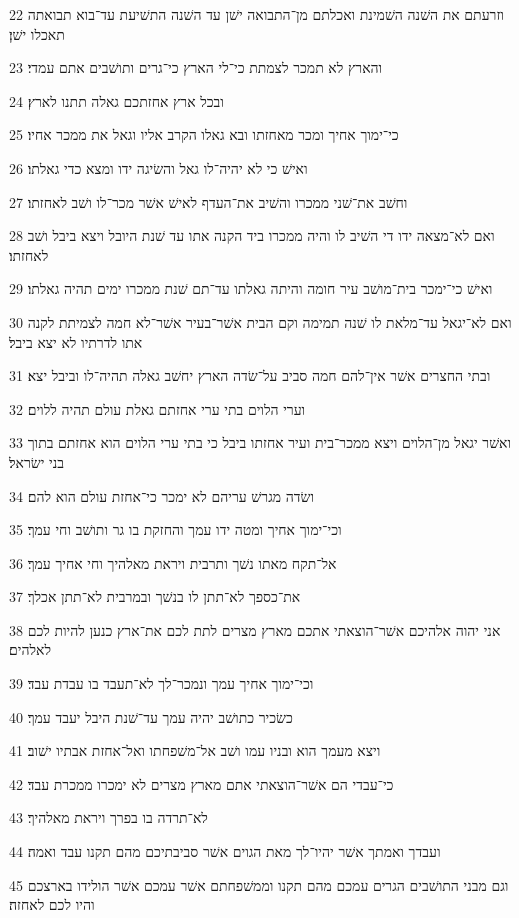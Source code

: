 \par 22 וזרעתם את השׁנה השׁמינת ואכלתם מן־התבואה ישׁן עד השׁנה התשׁיעת עד־בוא תבואתה תאכלו ישׁן׃
\par 23 והארץ לא תמכר לצמתת כי־לי הארץ כי־גרים ותושׁבים אתם עמדי׃
\par 24 ובכל ארץ אחזתכם גאלה תתנו לארץ׃
\par 25 כי־ימוך אחיך ומכר מאחזתו ובא גאלו הקרב אליו וגאל את ממכר אחיו׃
\par 26 ואישׁ כי לא יהיה־לו גאל והשׂיגה ידו ומצא כדי גאלתו׃
\par 27 וחשׁב את־שׁני ממכרו והשׁיב את־העדף לאישׁ אשׁר מכר־לו ושׁב לאחזתו׃
\par 28 ואם לא־מצאה ידו די השׁיב לו והיה ממכרו ביד הקנה אתו עד שׁנת היובל ויצא ביבל ושׁב לאחזתו׃
\par 29 ואישׁ כי־ימכר בית־מושׁב עיר חומה והיתה גאלתו עד־תם שׁנת ממכרו ימים תהיה גאלתו׃
\par 30 ואם לא־יגאל עד־מלאת לו שׁנה תמימה וקם הבית אשׁר־בעיר אשׁר־לא חמה לצמיתת לקנה אתו לדרתיו לא יצא ביבל׃
\par 31 ובתי החצרים אשׁר אין־להם חמה סביב על־שׂדה הארץ יחשׁב גאלה תהיה־לו וביבל יצא׃
\par 32 וערי הלוים בתי ערי אחזתם גאלת עולם תהיה ללוים׃
\par 33 ואשׁר יגאל מן־הלוים ויצא ממכר־בית ועיר אחזתו ביבל כי בתי ערי הלוים הוא אחזתם בתוך בני ישׂראל׃
\par 34 ושׂדה מגרשׁ עריהם לא ימכר כי־אחזת עולם הוא להם׃
\par 35 וכי־ימוך אחיך ומטה ידו עמך והחזקת בו גר ותושׁב וחי עמך׃
\par 36 אל־תקח מאתו נשׁך ותרבית ויראת מאלהיך וחי אחיך עמך׃
\par 37 את־כספך לא־תתן לו בנשׁך ובמרבית לא־תתן אכלך׃
\par 38 אני יהוה אלהיכם אשׁר־הוצאתי אתכם מארץ מצרים לתת לכם את־ארץ כנען להיות לכם לאלהים׃
\par 39 וכי־ימוך אחיך עמך ונמכר־לך לא־תעבד בו עבדת עבד׃
\par 40 כשׂכיר כתושׁב יהיה עמך עד־שׁנת היבל יעבד עמך׃
\par 41 ויצא מעמך הוא ובניו עמו ושׁב אל־משׁפחתו ואל־אחזת אבתיו ישׁוב׃
\par 42 כי־עבדי הם אשׁר־הוצאתי אתם מארץ מצרים לא ימכרו ממכרת עבד׃
\par 43 לא־תרדה בו בפרך ויראת מאלהיך׃
\par 44 ועבדך ואמתך אשׁר יהיו־לך מאת הגוים אשׁר סביבתיכם מהם תקנו עבד ואמה׃
\par 45 וגם מבני התושׁבים הגרים עמכם מהם תקנו וממשׁפחתם אשׁר עמכם אשׁר הולידו בארצכם והיו לכם לאחזה׃
